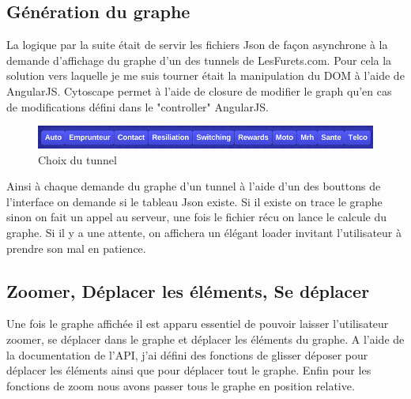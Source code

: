 \subsection{Génération du graphe}
La logique par la suite était de servir les fichiers Json de façon asynchrone à la demande d'affichage du graphe d'un des tunnels de LesFurets.com. Pour cela la solution vers laquelle je me suis tourner était la manipulation du DOM à l'aide de AngularJS. Cytoscape permet à l'aide de closure de modifier le graph qu'en cas de modifications défini dans le "controller" AngularJS. 
\vspace{0.2in}
\begin{figure}[!ht]
\center
\includegraphics[width=15cm]{outil/buttons-tunnels.png}
\caption{Choix du tunnel}
\end{figure}
Ainsi à chaque demande du graphe d'un tunnel à l'aide d'un des bouttons de l'interface on demande si le tableau Json existe. Si il existe on trace le graphe sinon on fait un appel au serveur, une fois le fichier récu on lance le calcule du graphe. Si il y a une attente, on affichera un élégant loader invitant l'utilisateur à prendre son mal en patience.

\subsection{Zoomer, Déplacer les éléments, Se déplacer}
Une fois le graphe affichée il est apparu essentiel de pouvoir laisser l’utilisateur zoomer, se déplacer dans le graphe et déplacer les éléments du graphe. A l'aide de la documentation de l'API, j'ai défini des fonctions de glisser déposer pour déplacer les éléments ainsi que pour déplacer tout le graphe. Enfin pour les fonctions de zoom nous avons passer tous le graphe en position relative.
\clearpage
